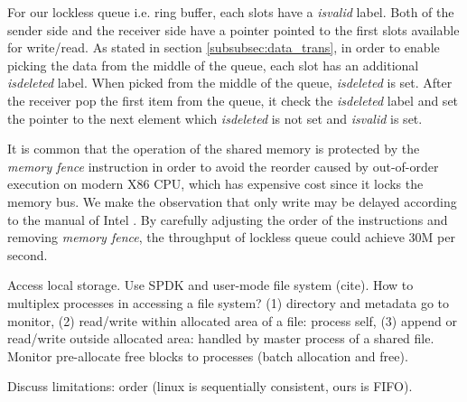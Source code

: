 For our lockless queue i.e. ring buffer, each slots have a \textit{isvalid} label. Both of the sender side and the receiver side have a pointer pointed to the first slots available for write/read. As stated in section \ref{subsubsec:data_trans}, in order to enable picking the data from the middle of the queue, each slot has an additional \textit{isdeleted} label. When picked from the middle of the queue, \textit{isdeleted} is set. After the receiver pop the first item from the queue, it check the \textit{isdeleted} label and set the pointer to the next element which \textit{isdeleted} is not set and \textit{isvalid} is set.

It is common that the operation of the shared memory is protected by the \textit{memory fence} instruction in order to avoid the reorder caused by out-of-order execution on modern X86 CPU, which has expensive cost since it locks the memory bus. We make the observation that only write may be delayed according to the manual of Intel \cite{sewell2010x86,intel-manual}. By carefully adjusting the order of the instructions and removing \textit{memory fence}, the throughput of lockless queue could achieve 30M per second. 


% 
% 

Access local storage. Use SPDK and user-mode file system (cite). How to multiplex processes in accessing a file system? (1) directory and metadata go to monitor, (2) read/write within allocated area of a file: process self, (3) append or read/write outside allocated area: handled by master process of a shared file. Monitor pre-allocate free blocks to processes (batch allocation and free).

Discuss limitations: order (linux is sequentially consistent, ours is FIFO).